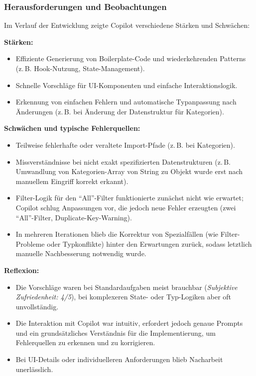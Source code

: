 \subsubsection{Herausforderungen und Beobachtungen}
Im Verlauf der Entwicklung zeigte Copilot verschiedene Stärken und Schwächen:

\textbf{Stärken:}
\begin{itemize}
    \item Effiziente Generierung von Boilerplate-Code und wiederkehrenden Patterns
          (z.\,B. Hook-Nutzung, State-Management).
    \item Schnelle Vorschläge für UI-Komponenten und einfache Interaktionslogik.
    \item Erkennung von einfachen Fehlern und automatische Typanpassung nach Änderungen
          (z.\,B. bei Änderung der Datenstruktur für Kategorien).
\end{itemize}

\textbf{Schwächen und typische Fehlerquellen:}
\begin{itemize}
    \item Teilweise fehlerhafte oder veraltete Import-Pfade (z.\,B. bei Kategorien).
    \item Missverständnisse bei nicht exakt spezifizierten Datenstrukturen (z.\,B.
          Umwandlung von Kategorien-Array von String zu Objekt wurde erst nach manuellem
          Eingriff korrekt erkannt).
    \item Filter-Logik für den ``All''-Filter funktionierte zunächst nicht wie erwartet;
          Copilot schlug Anpassungen vor, die jedoch neue Fehler erzeugten (zwei
          ``All''-Filter, Duplicate-Key-Warning).
    \item In mehreren Iterationen blieb die Korrektur von Spezialfällen (wie
          Filter-Probleme oder Typkonflikte) hinter den Erwartungen zurück, sodass
          letztlich manuelle Nachbesserung notwendig wurde.
\end{itemize}

\textbf{Reflexion:}
\begin{itemize}
    \item Die Vorschläge waren bei Standardaufgaben meist brauchbar (\textit{Subjektive
              Zufriedenheit: 4/5}), bei komplexeren State- oder Typ-Logiken aber oft
          unvollständig.
    \item Die Interaktion mit Copilot war intuitiv, erfordert jedoch genaue Prompts und
          ein grundsätzliches Verständnis für die Implementierung, um Fehlerquellen zu
          erkennen und zu korrigieren.
    \item Bei UI-Details oder individuelleren Anforderungen blieb Nacharbeit
          unerlässlich.
\end{itemize}

